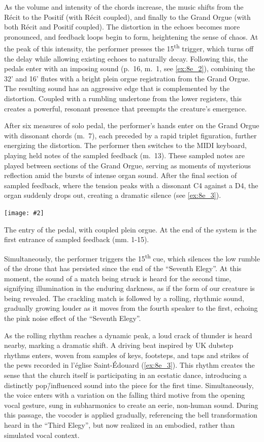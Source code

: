 \documentclass[12pt,twoside,maitrise]{dms_ks}
\newcommand{\customincludeexamples}[4][]{%
    \begin{example}[H]
        \centering
        \texttt{[image: \#2]}
        \caption{#4}
	\label{#3} 
    \end{example}
}
\theoremstyle{definition}
\begin{document}
{As the volume and intensity of the chords increase, the music shifts from the Récit to the Positif (with Récit coupled), and finally to the Grand Orgue (with both Récit and Positif coupled). 
The distortion in the echoes becomes more pronounced, and feedback loops begin to form, heightening the sense of chaos. 
At the peak of this intensity, the performer presses the 15\textsuperscript{th} trigger, which turns off the delay while allowing existing echoes to naturally decay. 
Following this, the pedals enter with an imposing sound (p.~16, m.~1, see \cref{ex:8e_2}), combining the 32' and 16' flutes with a bright plein orgue registration from the Grand Orgue. 
The resulting sound has an aggressive edge that is complemented by the distortion. 
Coupled with a rumbling undertone from the lower registers, this creates a powerful, resonant presence that preempts the creature’s emergence.

After six measures of solo pedal, the performer’s hands enter on the Grand Orgue with dissonant chords (m.~7), each preceded by a rapid triplet figuration, further energizing the distortion. 
The performer then switches to the MIDI keyboard, playing held notes of the sampled feedback (m.~13). 
These sampled notes are played between sections of the Grand Orgue, serving as moments of mysterious reflection amid the bursts of intense organ sound.
After the final section of sampled feedback, where the tension peaks with a dissonant C4 against a D4, the organ suddenly drops out, creating a dramatic silence (see \cref{ex:8e_3}). 

\customincludeexamples[width=\textwidth]{8e_2}{ex:8e_2}{The entry of the pedal, with coupled plein orgue. At the end of the system is the first entrance of sampled feedback (mm. 1-15).}

Simultaneously, the performer triggers the 15\textsuperscript{th} cue, which silences the low rumble of the drone that has persisted since the end of the “Seventh Elegy”. 
At this moment, the sound of a match being struck is heard for the second time, signifying illumination in the enduring darkness, as if the form of our creature is being revealed. 
The crackling match is followed by a rolling, rhythmic sound, gradually growing louder as it moves from the fourth speaker to the first, echoing the pink noise effect of the “Seventh Elegy”.

As the rolling rhythm reaches a dynamic peak, a loud crack of thunder is heard nearby, marking a dramatic shift. 
A driving beat inspired by UK dubstep rhythms enters, woven from samples of keys, footsteps, and taps and strikes of the pews recorded in l'église Saint-Édouard (\cref{ex:8e_3}). 
This rhythm creates the sense that the church itself is participating in an ecstatic dance, introducing a distinctly pop\=/influenced sound into the piece for the first time. 
Simultaneously, the voice enters with a variation on the falling third motive from the opening vocal gesture, sung in subharmonics to create an eerie, non-human sound. 
During this passage, the vocoder is applied gradually, referencing the bell transformation heard in the “Third Elegy”, but now realized in an embodied, rather than simulated vocal context.

}
\end{document}
